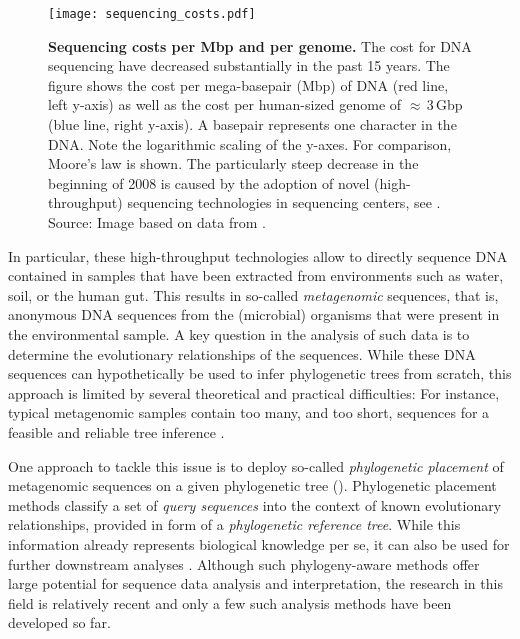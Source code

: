 \begin{figure}[hbt]
    \centering
    \texttt{[image: sequencing\_costs.pdf]}
    \caption[Sequencing costs per Mbp and per genome]{
        \textbf{Sequencing costs per Mbp and per genome.}
        The cost for DNA sequencing have decreased substantially in the past 15 years.
        The figure shows the cost per mega-basepair (Mbp) of DNA (red line, left y-axis)
        as well as the cost per human-sized genome of $\approx$\,\num{3}\,Gbp (blue line, right y-axis).
        A basepair represents one character in the DNA.
        Note the logarithmic scaling of the y-axes.
        For comparison, Moore's law \cite{Moore1965} is shown.
        The particularly steep decrease in the beginning of 2008 is caused by
        the adoption of novel (high-throughput) sequencing technologies in sequencing centers,
        see .
        Source: Image based on data from \cite{Wetterstrand2018}.
    }
    \label{fig:sequencing_costs}
\end{figure}

In particular, these high-throughput technologies allow to directly sequence DNA contained in samples
that have been extracted from environments such as water, soil, or the human gut.
This results in so-called \emph{metagenomic} sequences,
that is, anonymous DNA sequences from the (microbial) organisms that were present in the environmental sample.
A key question in the analysis of such data is to determine the evolutionary relationships of the sequences.
While these DNA sequences can hypothetically be used to infer phylogenetic trees from scratch,
this approach is limited by several theoretical and practical difficulties:
For instance, typical metagenomic samples contain too many, and too short, sequences
for a feasible and reliable tree inference \cite{Matsen2010,Janssen2018}.

One approach to tackle this issue is to deploy so-called \emph{phylogenetic placement} \cite{Matsen2010,Berger2011}
of metagenomic sequences on a given phylogenetic tree ().
Phylogenetic placement methods classify a set of \emph{query sequences}
into the context of known evolutionary relationships, provided in form of a \emph{phylogenetic reference tree}.
While this information already represents biological knowledge per se,
it can also be used for further downstream analyses \cite{Matsen2011a}.
Although such phylogeny-aware methods offer large potential for sequence data analysis and interpretation,
the research in this field is relatively recent and only a few such analysis methods have been developed so far.

